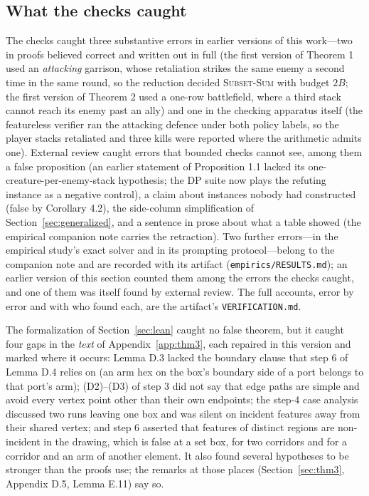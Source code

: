\documentclass[11pt,a4paper]{article}
\theoremstyle{plain}
\theoremstyle{definition}
\theoremstyle{plain}
\theoremstyle{definition}
\theoremstyle{remark}
\newcommand{\SUBSETSUM}{\textsc{Subset-Sum}}
\newcommand{\src}[1]{\texttt{#1}}
\begin{document}
\subsection{What the checks caught}\label{sec:errors}

The checks caught three substantive errors in earlier versions of this work---two in proofs
believed correct and written out in full (the first version of Theorem 1 used an
\emph{attacking} garrison, whose retaliation strikes the same enemy a second time in the
same round, so the reduction decided \SUBSETSUM{} with budget $2B$; the first version of
Theorem 2 used a one-row battlefield, where a third stack cannot reach its enemy past an
ally) and one in the checking apparatus itself (the featureless verifier ran the attacking
defence under both policy labels, so the player stacks retaliated and three kills were
reported where the arithmetic admits one). External review caught errors that bounded
checks cannot see, among them a false proposition (an earlier statement of Proposition 1.1
lacked its one-creature-per-enemy-stack hypothesis; the DP suite now plays the refuting
instance as a negative control), a claim about instances nobody had constructed (false by
Corollary 4.2), the side-column simplification of Section~\ref{sec:generalized}, and a
sentence in prose about what a table showed (the empirical companion note carries the
retraction). Two further errors---in the empirical study's exact solver and in its
prompting protocol---belong to the companion note and are recorded with its artifact
(\src{empirics/RESULTS.md}); an earlier version of this section counted them among the
errors the checks caught, and one of them was itself found by external review. The full
accounts, error by error and with who found each, are the artifact's
\src{VERIFICATION.md}.

The formalization of Section~\ref{sec:lean} caught no false theorem, but it caught four gaps
in the \emph{text} of Appendix~\ref{app:thm3}, each repaired in this version and marked where
it occurs: Lemma D.3 lacked the boundary clause that step 6 of Lemma D.4 relies on (an arm
hex on the box's boundary side of a port belongs to that port's arm); (D2)--(D3) of step 3
did not say that edge paths are simple and avoid every vertex point other than their own
endpoints; the step-4 case analysis discussed two runs leaving one box and was silent on
incident features away from their shared vertex; and step 6 asserted that features of
distinct regions are non-incident in the drawing, which is false at a set box, for two
corridors and for a corridor and an arm of another element. It also found several hypotheses to be stronger than
the proofs use; the remarks at those places (Section~\ref{sec:thm3}, Appendix D.5,
Lemma E.11) say so.
\end{document}
